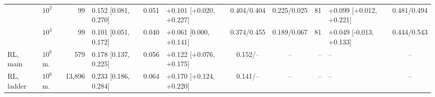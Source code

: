 \begin{tabular*}{\textwidth}{@{\extracolsep{\fill}}llrlrlccrlc@{}}
 & $10^{2}$ & 99 & 0.152 {\tiny[0.081, 0.270]} & 0.051 & +0.101 {\tiny[+0.020, +0.227]} & 0.404/0.404 & 0.225/0.025 & 81 & +0.099 {\tiny[+0.012, +0.221]} & 0.481/0.494 \\
 & $10^{3}$ & 99 & 0.101 {\tiny[0.051, 0.172]} & 0.040 & +0.061 {\tiny[0.000, +0.141]} & 0.374/0.455 & 0.189/0.067 & 81 & +0.049 {\tiny[\mbox{-}0.013, +0.133]} & 0.444/0.543 \\
\addlinespace[2pt]
RL, main & $10^{6}$ m. & 579 & 0.178 {\tiny[0.137, 0.225]} & 0.056 & +0.122 {\tiny[+0.076, +0.175]} & 0.152/-- & -- & -- & -- & -- \\
RL, ladder & $10^{6}$ m. & 13,896 & 0.233 {\tiny[0.186, 0.284]} & 0.064 & +0.170 {\tiny[+0.124, +0.220]} & 0.141/-- & -- & -- & -- & -- \\
\bottomrule
\end{tabular*}
